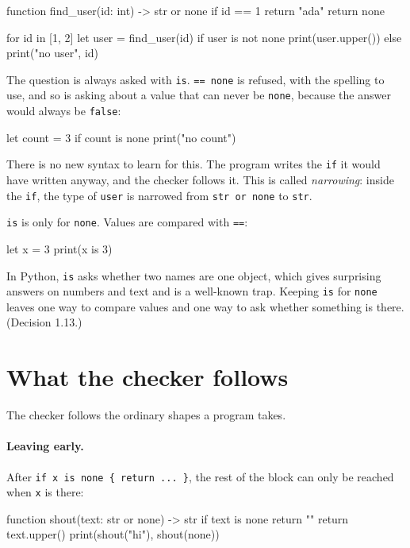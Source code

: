 \begin{zeno}
function find_user(id: int) -> str or none {
    if id == 1 {
        return "ada"
    }
    return none
}

for id in [1, 2] {
    let user = find_user(id)
    if user is not none {
        print(user.upper())
    } else {
        print("no user", id)
    }
}
\end{zeno}

The question is always asked with \verb|is|. \verb|== none| is
refused, with the spelling to use, and so is asking about a value that
can never be \verb|none|, because the answer would always be
\verb|false|:

\begin{zeno}[fails=yes]
let count = 3
if count is none {
    print("no count")
}
\end{zeno}

There is no new syntax to learn for this. The program writes the
\verb|if| it would have written anyway, and the checker follows it.
This is called \emph{narrowing}: inside the \verb|if|, the type of
\verb|user| is narrowed from \verb|str or none| to \verb|str|.

\verb|is| is only for \verb|none|. Values are compared with
\verb|==|:

\begin{zeno}[fails=yes]
let x = 3
print(x is 3)
\end{zeno}

\begin{why}
In Python, \verb|is| asks whether two names are one object, which gives
surprising answers on numbers and text and is a well-known trap.
Keeping \verb|is| for \verb|none| leaves one way to compare values and
one way to ask whether something is there. (Decision 1.13.)
\end{why}

\section{What the checker follows}

The checker follows the ordinary shapes a program takes.

\paragraph{Leaving early.} After \verb|if x is none { return ... }|,
the rest of the block can only be reached when \verb|x| is there:

\begin{zeno}
function shout(text: str or none) -> str {
    if text is none {
        return ""
    }
    return text.upper()
}
print(shout("hi"), shout(none))
\end{zeno}

